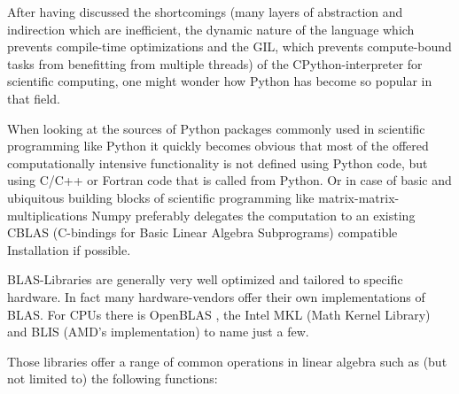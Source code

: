 \documentclass[english,11pt,a4paper,table]{article} %
\begin{document}
After having discussed the shortcomings (many layers of abstraction and indirection which are inefficient,
the dynamic nature of the language which prevents compile-time optimizations and
the GIL, which prevents compute-bound tasks from benefitting from multiple threads) of the CPython-interpreter for scientific computing,
one might wonder how Python has become so popular in that field.

When looking at the sources of Python packages commonly used in scientific programming like Python it quickly becomes obvious that most of the offered
computationally intensive functionality is not defined using Python code,
but using C/C++ or Fortran code that is called from Python.
Or in case of basic and ubiquitous building blocks of scientific programming like matrix-matrix-multiplications Numpy preferably
delegates the computation to an existing CBLAS \cite{BLAS} (C-bindings for Basic Linear Algebra Subprograms) compatible Installation if possible. \cite{numpy_matmul_impl}

BLAS-Libraries are generally very well optimized and tailored to specific hardware.
In fact many hardware-vendors offer their own implementations of BLAS.
For CPUs there is OpenBLAS \cite{OpenBLAS}, the Intel MKL (Math Kernel Library) \cite{MKL} and BLIS (AMD's implementation) \cite{amdblis} to name just a few.

Those libraries offer a range of common operations in linear algebra such as (but not limited to) the following functions:
\end{document}
